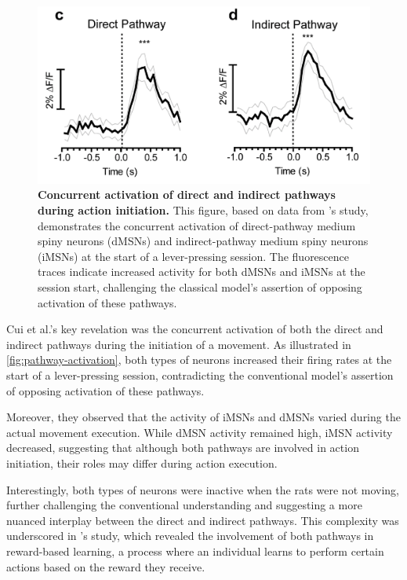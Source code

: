 \documentclass[10pt]{article}
\begin{document}
\begin{sloppypar}
  \begin{figure}[ht]
    \centering
    \includegraphics[width=\textwidth]{figures/direct-indirect-activation.png}
    \caption[Concurrent activation of direct and indirect pathways during action initiation]{\textbf{Concurrent activation of direct and indirect pathways during action initiation.} This figure, based on data from \cite{cui_concurrent_2013}’s study, demonstrates the concurrent activation of direct-pathway medium spiny neurons (dMSNs) and indirect-pathway medium spiny neurons (iMSNs) at the start of a lever-pressing session. The fluorescence traces indicate increased activity for both dMSNs and iMSNs at the session start, challenging the classical model’s assertion of opposing activation of these pathways.}
    \label{fig:pathway-activation}
  \end{figure}

  Cui et al.’s key revelation was the concurrent activation of both the direct and indirect pathways during the initiation of a movement. As illustrated in \autoref{fig:pathway-activation}, both types of neurons increased their firing rates at the start of a lever-pressing session, contradicting the conventional model’s assertion of opposing activation of these pathways.

  Moreover, they observed that the activity of iMSNs and dMSNs varied during the actual movement execution. While dMSN activity remained high, iMSN activity decreased, suggesting that although both pathways are involved in action initiation, their roles may differ during action execution.

  Interestingly, both types of neurons were inactive when the rats were not moving, further challenging the conventional understanding and suggesting a more nuanced interplay between the direct and indirect pathways. This complexity was underscored in \cite{guillaumin_experimental_2021}’s study, which revealed the involvement of both pathways in reward-based learning, a process where an individual learns to perform certain actions based on the reward they receive.


\end{sloppypar}
\end{document}
